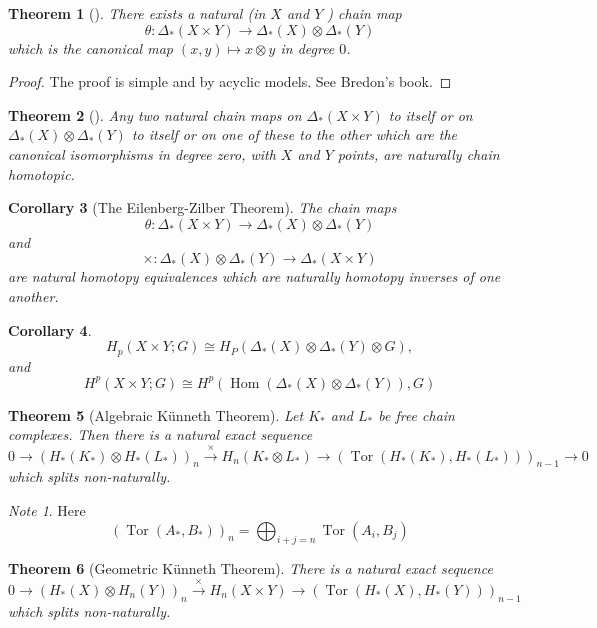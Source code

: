 \documentclass[reqno]{amsart}
\newtheorem{theorem}{Theorem}[section]
\newtheorem{corollary}[theorem]{Corollary}
\theoremstyle{definition}
\theoremstyle{remark}
\newtheorem*{note}{Note}
\DeclareMathOperator{\Hom}{Hom}
\DeclareMathOperator{\Tor}{Tor}
\begin{document}
\begin{theorem}[]
    There exists a natural (in $X$ and $Y$ ) chain
    map
    \[
    \theta \colon \Delta_* (X \times Y) \to 
    \Delta_* (X) \otimes \Delta_*(Y)
    \] 
    which is the canonical map $(x,y) \mapsto x \otimes y$ in
    degree $0$.
\end{theorem}

\begin{proof}
    The proof is simple and by acyclic models. See
    Bredon's book.
\end{proof}

\begin{theorem}[]
    Any two natural chain maps on
    $\Delta_*(X \times Y)$ to itself or on
    $\Delta_* (X) \otimes \Delta_*(Y)$ to itself or
    on one of these to the other which are the
    canonical isomorphisms in degree zero, with $X$ and
    $Y$ points, are naturally chain homotopic.
\end{theorem}

\begin{corollary}[The Eilenberg-Zilber Theorem]
    The chain maps
    \[
    \theta \colon \Delta_* (X \times Y) \to 
    \Delta_*(X) \otimes \Delta_*(Y)
    \] 
    and
    \[
    \times \colon \Delta_*(X) \otimes \Delta_*(Y)
    \to \Delta_*(X \times Y)
    \] 
    are natural homotopy equivalences which are naturally
    homotopy inverses of one another.
\end{corollary}

\begin{corollary}
    \[
    H_p(X \times Y; G) \cong
    H_P\left( \Delta_*(X) \otimes
    \Delta_*(Y) \otimes G\right) ,
    \] 
    and
    \[
    H^{p}\left( X \times Y;G \right) 
    \cong H^{p}\left( \Hom \left( 
    \Delta_*(X) \otimes \Delta_*(Y) \right) ,G \right) 
    \] 
\end{corollary}

\begin{theorem}[Algebraic Künneth Theorem]
    Let $K_*$ and $L_*$ be free chain complexes.
    Then there is a natural exact sequence
    \[
    0 \to 
    \left( H_* (K_*) \otimes H_*(L_*) \right)_n 
    \stackrel{\times }{\to} H_n(K_* \otimes L_*)
    \to \left(\Tor
    \left( H_*(K_*), H_*(L_*) \right) \right)_{n-1} \to 0
    \] 
    which splits non-naturally.
\end{theorem}

\begin{note}
    Here
    \[
        \left( \Tor(A_*,B_*) \right)_{n}
        = 
        \bigoplus_{i+j=n}
        \Tor(A_i,B_j)
    \] 
\end{note}

\begin{theorem}[Geometric Künneth Theorem]
    There is a natural exact sequence
    \[
    0 \to \left( H_*(X) \otimes
    H_n(Y) \right)_n \stackrel{\times }{\to} 
    H_n(X \times Y) \to 
    \left( \Tor\left( H_*(X), H_*(Y) \right) \right)_{n-1}
    \] 
    which splits non-naturally.
\end{theorem}






\end{document}
